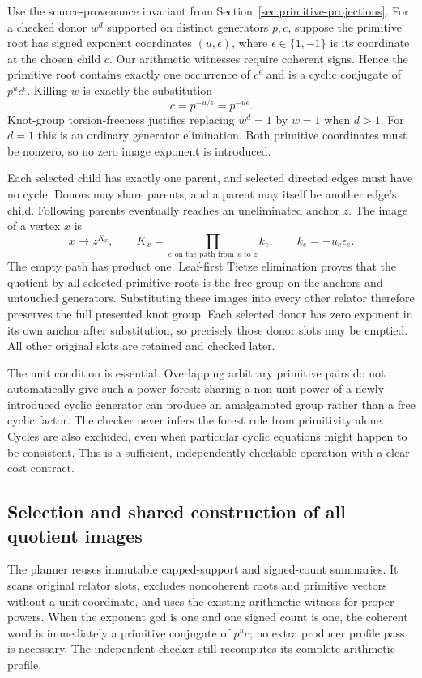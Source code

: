 Use the source-provenance invariant from
Section~\ref{sec:primitive-projections}. For a checked donor $w^d$ supported
on distinct generators $p,c$, suppose the primitive root has signed
exponent coordinates $(u,\epsilon)$, where $\epsilon\in\{1,-1\}$ is
its coordinate at the chosen child $c$. Our arithmetic witnesses require
coherent signs. Hence the primitive root contains exactly one occurrence
of $c^{\epsilon}$ and is a cyclic conjugate of
$p^u c^{\epsilon}$. Killing $w$ is exactly the substitution
\[
 c=p^{-u/\epsilon}=p^{-u\epsilon}.
\]
Knot-group torsion-freeness justifies replacing $w^d=1$ by $w=1$ when
$d>1$. For $d=1$ this is an ordinary generator elimination. Both primitive
coordinates must be nonzero, so no zero image exponent is introduced.

Each selected child has exactly one parent, and selected directed edges
must have no cycle. Donors may share parents, and a parent may itself be
another edge's child. Following parents eventually reaches an uneliminated
anchor $z$. The image of a vertex $x$ is
\[
 x\longmapsto z^{K_x},\qquad
 K_x=\prod_{e\text{ on the path from }x\text{ to }z} k_e,
 \qquad k_e=-u_e\epsilon_e.
\]
The empty path has product one. Leaf-first Tietze elimination proves that
the quotient by all selected primitive roots is the free group on the
anchors and untouched generators. Substituting these images into every
other relator therefore preserves the full presented knot group. Each
selected donor has zero exponent in its own anchor after substitution,
so precisely those donor slots may be emptied. All other original slots
are retained and checked later.

The unit condition is essential. Overlapping arbitrary primitive pairs
do not automatically give such a power forest: sharing a non-unit power
of a newly introduced cyclic generator can produce an amalgamated group
rather than a free cyclic factor. The checker never infers the forest
rule from primitivity alone. Cycles are also excluded, even when particular
cyclic equations might happen to be consistent. This is a sufficient,
independently checkable operation with a clear cost contract.

\subsection{Selection and shared construction of all quotient images}

The planner reuses immutable capped-support and signed-count summaries.
It scans original relator slots, excludes noncoherent roots and primitive
vectors without a unit coordinate, and uses the existing arithmetic witness
for proper powers. When the exponent gcd is one and one signed count is
one, the coherent word is immediately a primitive conjugate of $p^u c$;
no extra producer profile pass is necessary. The independent checker still
recomputes its complete arithmetic profile.

